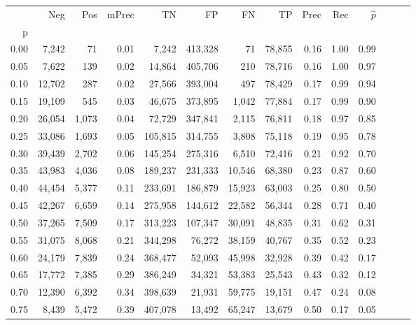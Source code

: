 \begin{tabular}{rrrrrrrrrrrrrr}
\toprule
{} &     Neg &    Pos & mPrec &       TN &       FP &      FN &      TP &  Prec &   Rec & $\hat{p}$ \\
p    &         &        &       &          &          &         &         &       &       &           \\
\midrule
0.00 &   7,242 &     71 &  0.01 &    7,242 &  413,328 &      71 &  78,855 &  0.16 &  1.00 &      0.99 \\
0.05 &   7,622 &    139 &  0.02 &   14,864 &  405,706 &     210 &  78,716 &  0.16 &  1.00 &      0.97 \\
0.10 &  12,702 &    287 &  0.02 &   27,566 &  393,004 &     497 &  78,429 &  0.17 &  0.99 &      0.94 \\
0.15 &  19,109 &    545 &  0.03 &   46,675 &  373,895 &   1,042 &  77,884 &  0.17 &  0.99 &      0.90 \\
0.20 &  26,054 &  1,073 &  0.04 &   72,729 &  347,841 &   2,115 &  76,811 &  0.18 &  0.97 &      0.85 \\
0.25 &  33,086 &  1,693 &  0.05 &  105,815 &  314,755 &   3,808 &  75,118 &  0.19 &  0.95 &      0.78 \\
0.30 &  39,439 &  2,702 &  0.06 &  145,254 &  275,316 &   6,510 &  72,416 &  0.21 &  0.92 &      0.70 \\
0.35 &  43,983 &  4,036 &  0.08 &  189,237 &  231,333 &  10,546 &  68,380 &  0.23 &  0.87 &      0.60 \\
0.40 &  44,454 &  5,377 &  0.11 &  233,691 &  186,879 &  15,923 &  63,003 &  0.25 &  0.80 &      0.50 \\
0.45 &  42,267 &  6,659 &  0.14 &  275,958 &  144,612 &  22,582 &  56,344 &  0.28 &  0.71 &      0.40 \\
0.50 &  37,265 &  7,509 &  0.17 &  313,223 &  107,347 &  30,091 &  48,835 &  0.31 &  0.62 &      0.31 \\
0.55 &  31,075 &  8,068 &  0.21 &  344,298 &   76,272 &  38,159 &  40,767 &  0.35 &  0.52 &      0.23 \\
0.60 &  24,179 &  7,839 &  0.24 &  368,477 &   52,093 &  45,998 &  32,928 &  0.39 &  0.42 &      0.17 \\
0.65 &  17,772 &  7,385 &  0.29 &  386,249 &   34,321 &  53,383 &  25,543 &  0.43 &  0.32 &      0.12 \\
0.70 &  12,390 &  6,392 &  0.34 &  398,639 &   21,931 &  59,775 &  19,151 &  0.47 &  0.24 &      0.08 \\
0.75 &   8,439 &  5,472 &  0.39 &  407,078 &   13,492 &  65,247 &  13,679 &  0.50 &  0.17 &      0.05 \\

\end{tabular}

